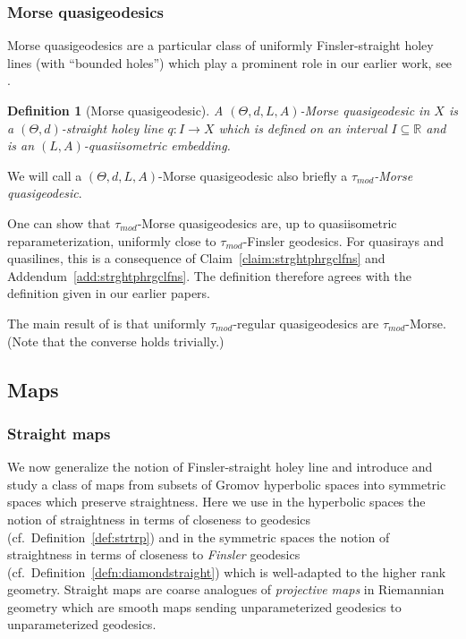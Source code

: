 \documentclass[12pt]{article}
\theoremstyle{boldplain}
\theoremstyle{bolddefinition}
\newtheorem{definition}[equation]{Definition}
\numberwithin{equation}{section}
\def\R{{\mathbb R}}
\def\taumod{\tau_{mod}}
\begin{document}
\subsubsection{Morse quasigeodesics}

Morse quasigeodesics are a particular class of uniformly Finsler-straight holey lines (with ``bounded holes'') 
which play a prominent role in our earlier work,
see \cite{morse, mlem, anolec}.

\begin{definition}[Morse quasigeodesic]
A {\em $(\Theta,d,L,A)$-Morse quasigeodesic} in $X$ is a $(\Theta,d)$-straight holey line $q:I\to X$ 
which is defined on an interval $I\subseteq\R$ and is an $(L,A)$-qua\-si\-iso\-met\-ric embedding. 
\end{definition}

We will call a $(\Theta,d,L,A)$-Morse quasigeodesic also briefly a {\em $\taumod$-Morse quasigeodesic}.

One can show that $\taumod$-Morse quasigeodesics are,
up to quasiisometric reparameterization, 
uniformly close to 
$\taumod$-Finsler geodesics.
For quasirays and quasilines, this is a consequence of Claim~\ref{claim:strghtphrgclfns} and Addendum~\ref{add:strghtphrgclfns}.
The definition therefore agrees with the definition given in our earlier papers.

The main result of \cite{mlem} is that uniformly $\taumod$-regular quasigeodesics are $\taumod$-Morse.
(Note that the converse holds trivially.)



\subsection{Maps}\label{sec:maps}
\subsubsection{Straight maps}

We now generalize the notion of Finsler-straight holey line
and introduce and study a class of maps from subsets of Gromov hyperbolic spaces into symmetric spaces 
which preserve straightness.
Here we use in the hyperbolic spaces the notion of straightness in terms of closeness to geodesics (cf.\ Definition~\ref{def:strtrp})
and in the symmetric spaces the notion of straightness in terms of closeness to {\em Finsler} geodesics (cf.\ Definition~\ref{defn:diamondstraight})
which is well-adapted to the higher rank geometry.
Straight maps are coarse analogues of {\em projective maps} in Riemannian geometry 
which are smooth maps sending unparameterized geodesics to unparameterized geodesics. 
\end{document}
